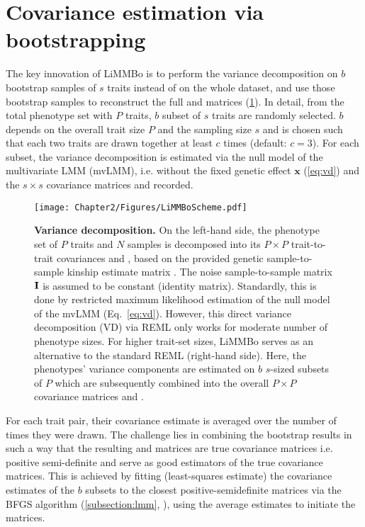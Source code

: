 \section{Covariance estimation via bootstrapping}
\label{section:bootstrapping-limmbo}
The key innovation of LiMMBo is to perform the variance decomposition on \(b\) bootstrap samples of \(s\) traits instead of on the whole dataset, and use those bootstrap samples to reconstruct the full  and  matrices (\cref{fig:vd}). In detail, from the total phenotype set with \(P\) traits, \(b\) subset of \(s\) traits are randomly selected.  \(b\) depends on the overall trait size \(P\) and the sampling size \(s\) and is chosen such that each two traits are drawn together at least \(c\) times (default: \(c=3\)). For each subset, the variance decomposition is estimated via the null model of the multivariate LMM (mvLMM), i.e. without the fixed genetic effect \(\mathbf{x}\) (\cref{eq:vd}) and the $s \times s$ covariance matrices  and recorded. 
%
\begin{figure}[hbtp]
	\centering
	\texttt{[image: Chapter2/Figures/LiMMBoScheme.pdf]}
	\caption[\textbf{Variance decomposition.}]{\textbf{Variance decomposition.} On the left-hand side, the phenotype set of \(P\) traits and \(N\) samples is decomposed into its \(P \times P\) trait-to-trait covariances  and , based on the provided genetic sample-to-sample kinship estimate matrix . The noise sample-to-sample matrix \(\boldsymbol{\mathbf{I}}\) is assumed to be constant (identity matrix). Standardly, this is done by restricted maximum likelihood estimation of the null model of the mvLMM (Eq.~\ref{eq:vd}). However, this direct variance decomposition (VD) via REML only works for moderate number of phenotype sizes. For higher trait-set sizes, LiMMBo serves as an alternative to the standard REML (right-hand side). Here, the phenotypes' variance components are estimated on \(b\) \(s\)-sized subsets of \(P\) which are subsequently combined into the overall \(P \times P\) covariance matrices  and .} 
	 	\label{fig:vd}
\end{figure}
%
 For each trait pair, their covariance estimate is averaged over the number of times they were drawn. The challenge lies in combining the bootstrap results in such a way that the resulting  and  matrices are true covariance matrices i.e. positive semi-definite and serve as good estimators of the true covariance matrices. This is achieved by fitting (least-squares estimate) the covariance estimates of the \(b\) subsets to the closest positive-semidefinite matrices via the BFGS algorithm (\cref{subsection:lmm}, \citep{Byrd1995}), using the average estimates to initiate the matrices. 


